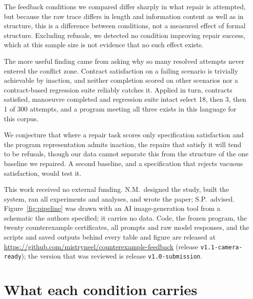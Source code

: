 \documentclass{article}
\begin{document}
The feedback conditions we compared differ sharply in what repair is attempted,
but because the raw trace differs in length and information content as well as
in structure, this is a difference between conditions, not a measured effect of
formal structure. Excluding refusals, we detected no condition improving repair
success, which at this sample size is not evidence that no such effect exists.

The more useful finding came from asking why so many resolved attempts never
entered the conflict zone. Contract satisfaction on a failing scenario is trivially achievable by
inaction, and neither completion scored on other scenarios nor a contract-based
regression suite reliably catches it. Applied in turn, contracts satisfied, manoeuvre
completed and regression suite intact select 18, then 3, then 1 of 300 attempts,
and a program meeting all three exists in this language for this corpus.

We conjecture that where a repair task scores only specification satisfaction
and the program representation admits inaction, the repairs that satisfy it will
tend to be refusals, though our data cannot separate this from the structure of
the one baseline we repaired. A second baseline, and a specification that rejects
vacuous satisfaction, would test it.

\begin{ack}
This work received no external funding. N.M.\ designed the study, built the
system, ran all experiments and analyses, and wrote the paper; S.P.\ advised.
Figure~\ref{fig:pipeline} was drawn with an AI image-generation tool from a
schematic the authors specified; it carries no data. Code, the frozen program,
the twenty counterexample certificates, all prompts and raw model responses, and
the scripts and saved outputs behind every table and figure are released at
\url{https://github.com/mistryneel/counterexample-feedback} (release
\texttt{v1.1-camera-ready}); the version that was reviewed is release
\texttt{v1.0-submission}.
\end{ack}




\appendix

\section{What each condition carries}
\label{app:info}
\end{document}
